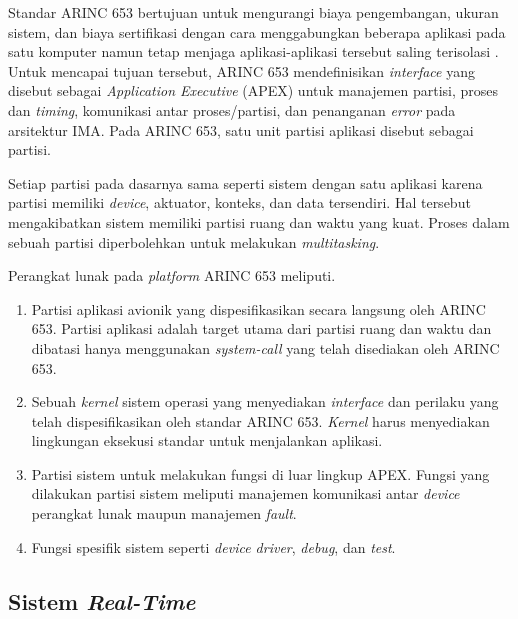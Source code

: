 Standar ARINC 653 bertujuan untuk mengurangi biaya pengembangan, ukuran sistem, dan biaya
sertifikasi dengan cara menggabungkan beberapa aplikasi pada satu komputer namun tetap menjaga
aplikasi-aplikasi tersebut saling terisolasi
\citep[pp.~3-30]{AirlinesElectronicEngineeringCommittee2012}.  Untuk mencapai tujuan tersebut,
ARINC 653 mendefinisikan \textit{interface} yang disebut sebagai \textit{Application Executive}
(APEX) untuk manajemen partisi, proses dan \textit{timing}, komunikasi antar proses/partisi, dan
penanganan \textit{error} pada arsitektur IMA.  Pada ARINC 653, satu unit partisi aplikasi
disebut sebagai partisi.

Setiap partisi pada dasarnya sama seperti sistem dengan satu aplikasi karena partisi memiliki
\textit{device}, aktuator, konteks, dan data tersendiri.  Hal tersebut mengakibatkan sistem
memiliki partisi ruang dan waktu yang kuat.  Proses dalam sebuah partisi diperbolehkan untuk
melakukan \textit{multitasking}.

Perangkat lunak pada \textit{platform} ARINC 653 meliputi.

\begin{enumerate}

    \item Partisi aplikasi avionik yang dispesifikasikan secara langsung oleh ARINC 653. Partisi
    	    aplikasi adalah target utama dari partisi ruang dan waktu dan dibatasi hanya
    	    menggunakan \textit{system-call} yang telah disediakan oleh ARINC 653.

    \item Sebuah \textit{kernel} sistem operasi yang menyediakan \textit{interface} dan perilaku
    	    yang telah dispesifikasikan oleh standar ARINC 653. \textit{Kernel} harus
    	    menyediakan lingkungan eksekusi standar untuk menjalankan aplikasi.

    \item Partisi sistem untuk melakukan fungsi di luar lingkup APEX. Fungsi yang dilakukan
    	    partisi sistem meliputi manajemen komunikasi antar \textit{device} perangkat lunak
    	    maupun manajemen \textit{fault}.

    \item Fungsi spesifik sistem seperti \textit{device driver}, \textit{debug}, dan
    	    \textit{test}.

\end{enumerate}

\subsection{Sistem \textit{Real-Time}}

